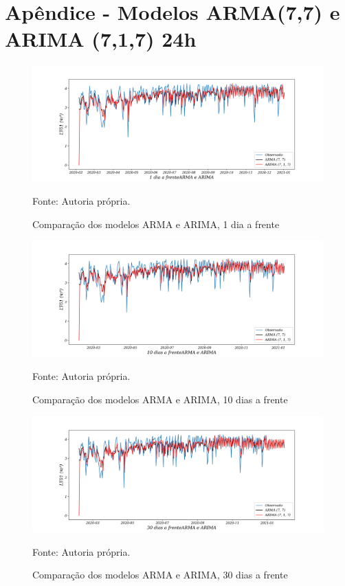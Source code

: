 
\section{Apêndice - Modelos ARMA(7,7) e ARIMA (7,1,7) 24h}\label{sec:armaarima24}

\begin{figure}[H]
	\centering
	\caption{Comparação dos modelos ARMA e ARIMA, 1 dia a frente }
	\label{fig:1-ARMA-ARIMA24}
	\includegraphics[width=1\linewidth]{Apendices/Figuras/modelagem-24h/1-ARMA-ARIMA}
	
	Fonte: Autoria própria.
\end{figure}

\begin{figure}[H]
	\centering
	\caption{Comparação dos modelos ARMA e ARIMA, 10 dias a frente }
	\label{fig:10-ARMA-ARIMA24}
	\includegraphics[width=1\linewidth]{Apendices/Figuras/modelagem-24h/10-ARMA-ARIMA}
	
	Fonte: Autoria própria.
\end{figure}


\begin{figure}[H]
	\centering
	\caption{Comparação dos modelos ARMA e ARIMA, 30 dias a frente }
	\label{fig:30-ARMA-ARIMA24}
	\includegraphics[width=1\linewidth]{Apendices/Figuras/modelagem-24h/30-ARMA-ARIMA}
	
	Fonte: Autoria própria.
\end{figure}

